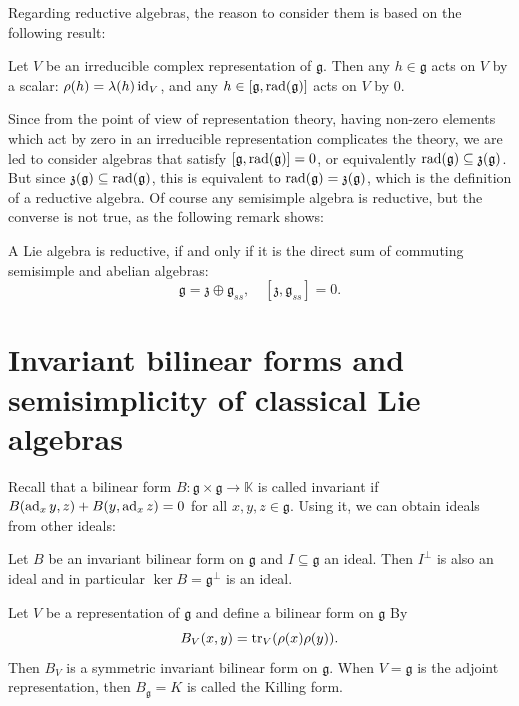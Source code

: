 \documentclass{report}
\begin{document}
Regarding reductive algebras, the reason to consider them is based on the following result:
\begin{proposition}
    Let $V$ be an irreducible complex representation of $\mathfrak g$.
    Then any $h \in \mathfrak g$ acts on $V$ by a scalar: $\rho(h) = \lambda(h) \operatorname{id}_V$, and any $h \in [\mathfrak g, \operatorname{rad}(\mathfrak g)]$ acts on $V$ by $0$.
\end{proposition}
Since from the point of view of representation theory, having non-zero elements which act by zero in an irreducible representation complicates the theory, we are led to consider algebras that satisfy $[\mathfrak g, \operatorname{rad}(\mathfrak g)] = 0$, or equivalently $\operatorname{rad}(\mathfrak g) \subseteq \mathfrak z(\mathfrak g)$.
But since $\mathfrak z(\mathfrak g) \subseteq \operatorname{rad}(\mathfrak g)$, this is equivalent to $\operatorname{rad}(\mathfrak g) = \mathfrak z(\mathfrak g)$, which is the definition of a reductive algebra. 
Of course any semisimple algebra is reductive, but the converse is not true, as the following remark shows:
\begin{remark}
    A Lie algebra is reductive, if and only if it is the direct sum of commuting semisimple and abelian algebras:
\[
\mathfrak g = \mathfrak z \oplus \mathfrak g_{ss}, \quad [\mathfrak z, \mathfrak g_{ss}] = 0.
\]
\end{remark}

\section{Invariant bilinear forms and semisimplicity of classical Lie algebras}
Recall that a bilinear form $B: \mathfrak g \times \mathfrak g \to \mathbb K$ is called invariant if $B(\operatorname{ad}_x y,z) + B(y,\operatorname{ad}_x z) = 0$ for all $x,y,z \in \mathfrak g$.
Using it, we can obtain ideals from other ideals:
\begin{lemma}
    Let $B$ be an invariant bilinear form on $\mathfrak g$ and $I \subseteq \mathfrak g$ an ideal.
    Then $I^\perp$ is also an ideal and in particular $\ker B = \mathfrak g^\perp$ is an ideal.
\end{lemma}
\begin{proposition}
    Let $V$ be a representation of $\mathfrak g$ and define a bilinear form on $\mathfrak g$ By
    \[
    B_V(x,y) = \operatorname{tr}_V(\rho(x) \rho(y)).
    \] 
    Then $B_V$ is a symmetric invariant bilinear form on $\mathfrak g$.
    When $V = \mathfrak g$ is the adjoint representation, then $B_{\mathfrak g} = K$ is called the Killing form.
\end{proposition}
\end{document}
